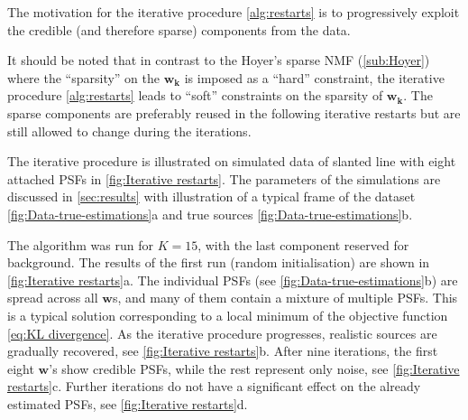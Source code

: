 The motivation for the iterative procedure \autoref{alg:restarts} is to progressively exploit the credible (and therefore sparse) components from the data.  

It should be noted that in contrast to the Hoyer's sparse NMF (\autoref{sub:Hoyer}) where the ``sparsity'' on the $\bm{w_{k}}$ is imposed as a ``hard'' constraint, the iterative procedure \autoref{alg:restarts} leads to ``soft'' constraints on the sparsity of $\bm{w_{k}}$. The sparse components are preferably reused in the following iterative restarts but are still allowed to change during the iterations. 

The iterative procedure is illustrated on simulated data of slanted line with eight attached PSFs in \autoref{fig:Iterative restarts}. The parameters of the simulations are discussed in  \autoref{sec:results} with illustration of a typical frame of the dataset \autoref{fig:Data-true-estimations}a and true sources \autoref{fig:Data-true-estimations}b.

The algorithm was run for $K=15$, with the last component reserved for background. The results of the first run (random initialisation) are shown in \autoref{fig:Iterative restarts}a. The individual PSFs (see \autoref{fig:Data-true-estimations}b) are spread across all $\bm{w}$s, and many of them contain a mixture of multiple PSFs. This is a typical solution corresponding to a local minimum of the objective function \autoref{eq:KL divergence}. As the iterative procedure progresses, realistic sources are gradually recovered, see \autoref{fig:Iterative restarts}b. After nine iterations, the first eight $\bm{w}$'s show credible PSFs, while the rest represent only noise, see \autoref{fig:Iterative restarts}c. Further iterations do not have a significant effect on the already estimated PSFs, see \autoref{fig:Iterative restarts}d. 

